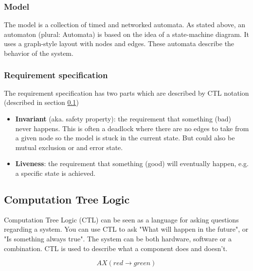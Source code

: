 \subsubsection{Model}
The model is a collection of timed and networked automata. As stated above, an automaton (plural: Automata) is based on the idea of a state-machine diagram. It uses a graph-style layout with nodes and edges. These automata describe the behavior of the system.
\subsubsection{Requirement specification}
The requirement specification has two parts which are described by CTL notation (described in section \ref{subsec:CTL})
\begin{itemize}
    \item \textbf{Invariant} (aka. safety property): the requirement that something (bad) never happens. This is often a deadlock where there are no edges to take from a given node so the model is stuck in the current state. But could also be mutual exclusion or and error state.
    \item \textbf{Liveness}: the requirement that something (good) will eventually happen, e.g. a specific state is achieved.
\end{itemize}



\subsection{Computation Tree Logic}
\label{subsec:CTL}
Computation Tree Logic (CTL) can be seen as a language for asking questions regarding a system. You can use CTL to ask "What will happen in the future", or "Is something always true". The system can be both hardware, software or a combination. CTL is used to describe what a component does and doesn't.

\begin{equation*}
    AX (red \rightarrow green)
\end{equation*}

